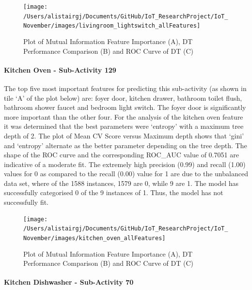 \documentclass[11pt,]{article}
\let\oldparagraph\paragraph
\renewcommand{\paragraph}[1]{\oldparagraph{#1}\mbox{}}
\begin{document}
\begin{figure}[H]

{\centering \texttt{[image: /Users/alistairgj/Documents/GitHub/IoT\_ResearchProject/IoT\_November/images/livingroom\_lightswitch\_allFeatures]} 

}

\caption{Plot of Mutual Information Feature Importance (A), DT Performance Comparison (B) and ROC Curve of DT (C)}\label{fig:unnamed-chunk-24}
\end{figure}

\hypertarget{kitchen-oven---sub-activity-129-1}{%
\paragraph{Kitchen Oven - Sub-Activity
129}\label{kitchen-oven---sub-activity-129-1}}

The top five most important features for predicting this sub-activity
(as shown in tile `A' of the plot below) are: foyer door, kitchen
drawer, bathroom toilet flush, bathroom shower faucet and bedroom light
switch. The foyer door is significantly more important than the other
four. For the analysis of the kitchen oven feature it was determined
that the best parameters were `entropy' with a maximum tree depth of 2.
The plot of Mean CV Score versus Maximum depth shows that `gini' and
`entropy' alternate as the better parameter depending on the tree depth.
The shape of the ROC curve and the corresponding ROC\_AUC value of
0.7051 are indicative of a moderate fit. The extremely high precision
(0.99) and recall (1.00) values for 0 as compared to the recall (0.00)
value for 1 are due to the unbalanced data set, where of the 1588
instances, 1579 are 0, while 9 are 1. The model has successfully
categorised 0 of the 9 instances of 1. Thus, the model has not
successfully fit.

\begin{figure}[H]

{\centering \texttt{[image: /Users/alistairgj/Documents/GitHub/IoT\_ResearchProject/IoT\_November/images/kitchen\_oven\_allFeatures]} 

}

\caption{Plot of Mutual Information Feature Importance (A), DT Performance Comparison (B) and ROC Curve of DT (C)}\label{fig:unnamed-chunk-25}
\end{figure}

\hypertarget{kitchen-dishwasher---sub-activity-70-1}{%
\paragraph{Kitchen Dishwasher - Sub-Activity
70}\label{kitchen-dishwasher---sub-activity-70-1}}
\end{document}
